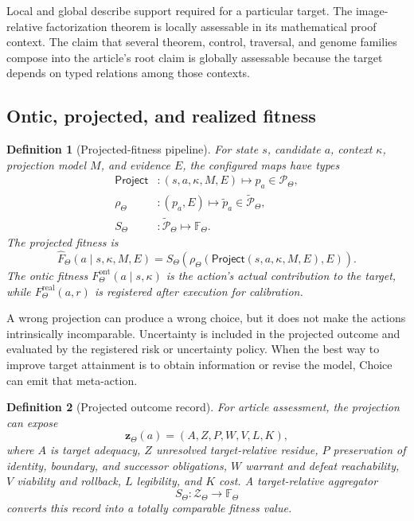 \documentclass[10pt]{article}
\newtheorem{definition}{Definition}[section]
\newcommand{\ProjFit}{\widehat F}
\newcommand{\OntFit}{F^{\mathrm{ont}}}
\newcommand{\RealFit}{F^{\mathrm{real}}}
\newcommand{\Project}{\mathsf{Project}}
\newcommand{\Target}{\Theta}
\begin{document}
Local and global describe support required for a particular target.  The image-relative factorization theorem is locally assessable in its mathematical proof context.  The claim that several theorem, control, traversal, and genome families compose into the article's root claim is globally assessable because the target depends on typed relations among those contexts.

\subsection{Ontic, projected, and realized fitness}

\begin{definition}[Projected-fitness pipeline]
For state $s$, candidate $a$, context $\kappa$, projection model $M$, and evidence $E$, the configured maps have types
\[
\begin{aligned}
\Project &: (s,a,\kappa,M,E)\longmapsto p_a\in\mathcal P_\Target,\\
\rho_\Target &: (p_a,E)\longmapsto \widetilde p_a\in\widetilde{\mathcal P}_\Target,\\
S_\Target &: \widetilde{\mathcal P}_\Target\longmapsto \mathbb F_\Target.
\end{aligned}
\]
The projected fitness is
\[
  \ProjFit_\Target(a\mid s,\kappa,M,E)
  =S_\Target\!\left(\rho_\Target(\Project(s,a,\kappa,M,E),E)\right).
\]
The ontic fitness $\OntFit_\Target(a\mid s,\kappa)$ is the action's actual contribution to the target, while $\RealFit_\Target(a,r)$ is registered after execution for calibration.
\end{definition}

A wrong projection can produce a wrong choice, but it does not make the actions intrinsically incomparable.  Uncertainty is included in the projected outcome and evaluated by the registered risk or uncertainty policy.  When the best way to improve target attainment is to obtain information or revise the model, Choice can emit that meta-action.

\begin{definition}[Projected outcome record]
For article assessment, the projection can expose
\[
  \mathbf z_\Target(a)=(A,Z,P,W,V,L,K),
\]
where $A$ is target adequacy, $Z$ unresolved target-relative residue, $P$ preservation of identity, boundary, and successor obligations, $W$ warrant and defeat reachability, $V$ viability and rollback, $L$ legibility, and $K$ cost.  A target-relative aggregator
\[
  S_\Target:\mathcal Z_\Target\to\mathbb F_\Target
\]
converts this record into a totally comparable fitness value.
\end{definition}
\end{document}
